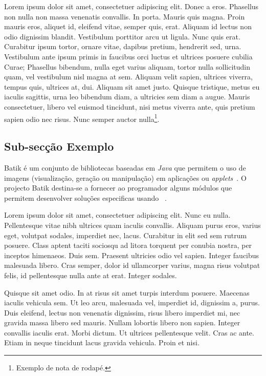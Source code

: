 Lorem ipsum dolor sit amet, consectetuer adipiscing elit. Donec a
eros. Phasellus non nulla non massa venenatis convallis. In
porta. Mauris quis magna. Proin mauris eros, aliquet id, eleifend
vitae, semper quis, erat. Aliquam id lectus non odio dignissim
blandit. Vestibulum porttitor arcu ut ligula. Nunc quis
erat. Curabitur ipsum tortor, ornare vitae, dapibus pretium, hendrerit
sed, urna. Vestibulum ante ipsum primis in faucibus orci luctus et
ultrices posuere cubilia Curae; Phasellus bibendum, nulla eget varius
aliquam, tortor nulla sollicitudin quam, vel vestibulum nisl magna at
sem. Aliquam velit sapien, ultrices viverra, tempus quis, ultrices at,
dui. Aliquam sit amet justo. Quisque tristique, metus eu iaculis
sagittis, urna leo bibendum diam, a ultricies sem diam a augue. Mauris
consectetuer, libero vel euismod tincidunt, nisi metus viverra ante,
quis pretium sapien odio nec risus. Nunc semper auctor
nulla\footnote{Exemplo de nota de rodapé.}. 

\subsection{Sub-secção Exemplo} \label{batik} 

Batik é um conjunto de bibliotecas baseadas em \textit{Java} que
permitem o uso de imagens \svg{} (visualização, geração ou
manipulação) em aplicações ou \textit{applets}~\citep{kn:batik}.  
O projecto Batik destina-se a fornecer ao programador
alguns módulos que permitem desenvolver soluções especificas usando
\svg~\citep{kn:svgdoc}. 

Lorem ipsum dolor sit amet, consectetuer adipiscing elit. Nunc eu
nulla. Pellentesque vitae nibh ultrices quam iaculis
convallis. Aliquam purus eros, varius eget, volutpat sodales,
imperdiet nec, lacus. Curabitur in elit sed sem rutrum posuere. Class
aptent taciti sociosqu ad litora torquent per conubia nostra, per
inceptos himenaeos. Duis sem. Praesent ultricies odio vel
sapien. Integer faucibus malesuada libero. Cras semper, dolor id
ullamcorper varius, magna risus volutpat felis, id pellentesque nulla
ante at erat. Integer sodales. 

Quisque sit amet odio. In at risus sit amet turpis interdum
posuere. Maecenas iaculis vehicula sem. Ut leo arcu, malesuada vel,
imperdiet id, dignissim a, purus. Duis eleifend, lectus non venenatis
dignissim, risus libero imperdiet mi, nec gravida massa libero sed
mauris. Nullam lobortis libero non sapien. Integer convallis iaculis
erat. Morbi dictum. Ut ultrices pellentesque velit. Cras ac
ante. Etiam in neque tincidunt lacus gravida vehicula. Proin et nisi. 

